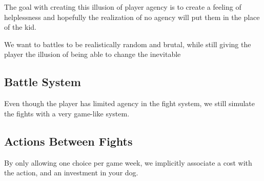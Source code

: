 The goal with creating this illusion of player agency is to create a feeling of helplessness and hopefully the realization of no agency will put them in the place of the kid. 

We want to battles to be realistically random and brutal, while still giving the player the illusion of being able to change the inevitable

\subsection{Battle System}
Even though the player has limited agency in the fight system, we still simulate the fights with a very game-like system.





\subsection{Actions Between Fights}
By only allowing one choice per game week, we implicitly associate a cost with the action, and an investment in your dog.

